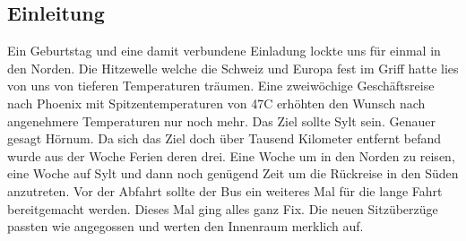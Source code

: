 ﻿%
% 
%



\subsection{Einleitung} 
Ein Geburtstag und eine damit verbundene Einladung lockte uns für einmal in den Norden.
Die Hitzewelle welche die Schweiz und Europa fest im Griff hatte lies von uns von tieferen Temperaturen träumen.
Eine zweiwöchige Geschäftsreise nach Phoenix mit Spitzentemperaturen von 47C erhöhten den Wunsch nach angenehmere Temperaturen nur noch mehr.
Das Ziel sollte Sylt sein.
Genauer gesagt Hörnum.
Da sich das Ziel doch über Tausend Kilometer entfernt befand wurde aus der Woche Ferien deren drei.
Eine Woche um in den Norden zu reisen, eine Woche auf Sylt und dann noch genügend Zeit um die Rückreise in den Süden anzutreten. 
Vor der Abfahrt sollte der Bus ein weiteres Mal für die lange Fahrt bereitgemacht werden.
Dieses Mal ging alles ganz Fix.
Die neuen Sitzüberzüge passten wie angegossen und werten den Innenraum merklich auf.

